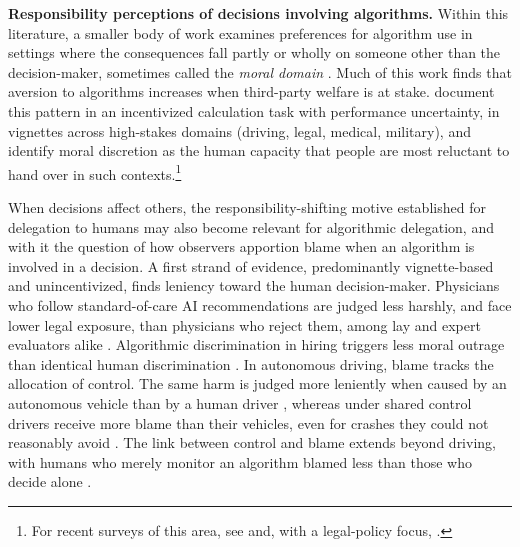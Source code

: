 \textbf{Responsibility perceptions of decisions involving algorithms.} Within this literature, a smaller body of work examines preferences for algorithm use in settings where the consequences fall partly or wholly on someone other than the decision-maker, sometimes called the \textit{moral domain} \citep{gogoll_rage_2018}. Much of this work finds that aversion to algorithms increases when third-party welfare is at stake. \citet{gogoll_rage_2018} document this pattern in an incentivized calculation task with performance uncertainty, \citet{bigman_people_2018} in vignettes across high-stakes domains (driving, legal, medical, military), and \citet{jauernig_people_2022} identify moral discretion as the human capacity that people are most reluctant to hand over in such contexts.\footnote{For recent surveys of this area, see \citet{bonnefon_moral_2024} and, with a legal-policy focus, \citet{sunstein_anatomy_2024}.}

When decisions affect others, the responsibility-shifting motive established for delegation to humans may also become relevant for algorithmic delegation, and with it the question of how observers apportion blame when an algorithm is involved in a decision. A first strand of evidence, predominantly vignette-based and unincentivized, finds leniency toward the human decision-maker. Physicians who follow standard-of-care AI recommendations are judged less harshly, and face lower legal exposure, than physicians who reject them, among lay and expert evaluators alike \citep{tobia_when_2021, tacconelli_how_2026}. Algorithmic discrimination in hiring triggers less moral outrage than identical human discrimination \citep{bigman_algorithmic_2023}. In autonomous driving, blame tracks the allocation of control. The same harm is judged more leniently when caused by an autonomous vehicle than by a human driver \citep{gill_blame_2020}, whereas under shared control drivers receive more blame than their vehicles, even for crashes they could not reasonably avoid \citep{awad_drivers_2020, beckers_drivers_2022}. The link between control and blame extends beyond driving, with humans who merely monitor an algorithm blamed less than those who decide alone \citep{shank_attributions_2019}.


